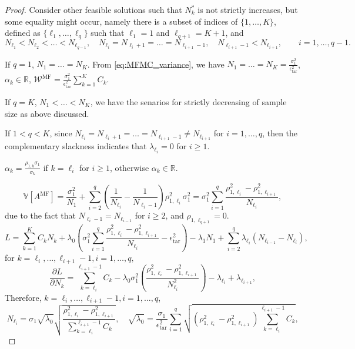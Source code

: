 \begin{proof}




Consider other feasible solutions such that $N_k^*$ is not strictly increases, but some equality might occur, namely there is a subset of indices of $\{1,\ldots, K\}$, defined as $\{\ell_1, \ldots, \ell_q\}$ such that $\ell_1=1$ and $\ell_{q+1} = K+1$, and
\[
N_{\ell_1}<N_{\ell_2}<\ldots < N_{\ell_{q-1}},\quad N_{\ell_i}=N_{\ell_i+1}=\ldots = N_{\ell_{i+1}-1}, \quad N_{\ell_{i+1}-1}<N_{\ell_{i+1}}, \qquad  i=1,\ldots,q-1.
\]


If $q=1$, $N_1=\ldots=N_K$. From \eqref{eq:MFMC_variance}, we have $N_1=\ldots=N_K=\frac{\sigma_1^2}{\epsilon_{\text{tar}}^2}$, $\alpha_k\in \mathbb{R}$, $\mathcal{W}^\text{MF} = \frac{\sigma_1^2}{\epsilon_{\text{tar}}^2} \sum_{k=1}^K C_k$.

If $q=K$, $N_1<\ldots<N_K$, we have the senarios for strictly decreasing of sample size as above discussed.


If $1<q <K$, since $N_{\ell_i}=N_{\ell_i+1}=\ldots=N_{\ell_{i+1}-1}\neq N_{\ell_{i+1}}$ for $i=1,\ldots,q$, then the complementary slackness indicates that $\lambda_{\ell_i}= 0$ for $i\ge 1$.

$\alpha_{k} = \frac{\rho_{1,k}\sigma_1}{\sigma_{k}}$ if $k=\ell_i$ for $i\ge 1$, otherwise $\alpha_k\in \mathbb{R}$. 

\[
\mathbb{V}\left[A^{\text{MF}}\right] = \frac{\sigma_1^2}{N_1}+\sum_{i=2}^q
\left(\frac{1}{N_{\ell_{i}}}-\frac{1}{N_{\ell_{i}-1}}\right)\rho_{1,\ell_i}^2\sigma_1^2=\sigma_1^2 \sum_{i=1}^{q} \frac{\rho_{1,\ell_i}^2-\rho_{1,\ell_{i+1}}^2}{N_{\ell_i}},
\]
due to the fact that $N_{\ell_{i}-1}=N_{\ell_{i-1}}$ for $i\ge 2$, and $\rho_{1,\ell_{q+1}}=0$.
%
\[
L = \sum_{k=1}^K C_kN_k +\lambda_0 \left(\sigma_1^2 \sum_{i=1}^{q} \frac{\rho_{1,\ell_i}^2-\rho_{1,\ell_{i+1}}^2}{N_{\ell_i}}- \epsilon_{\text{tar}}^2\right)-\lambda_1 N_1+\sum_{i=2}^q\lambda_{\ell_{i}}(N_{\ell_{i-1}} - N_{\ell_{i}}),
\]
%
for $k=\ell_i, \ldots, \ell_{i+1}-1, i = 1, \ldots,q,$
\[
\frac{\partial L}{\partial N_{k}} =\sum_{k=\ell_i}^{\ell_{i+1}-1} C_{k} - \lambda_0 \sigma_1^2\left(\frac{\rho_{1,\ell_i}^2-\rho_{1,\ell_{i+1}}^2}{N_{\ell_i}^2}\right)-\lambda_{\ell_{i}}+\lambda_{\ell_{i+1}},
\]
Therefore, $k=\ell_i, \ldots, \ell_{i+1}-1, i = 1, \ldots,q$,
\[
N_{\ell_i} = \sigma_1\sqrt{\lambda_0} \sqrt{\frac{\rho_{1,\ell_i}^2-\rho_{1,\ell_{i+1}}^2}{\sum_{k=\ell_i}^{\ell_{i+1}-1} C_{k}}},\quad \sqrt{\lambda_0}=\frac{\sigma_1}{\epsilon_{\text{tar}}^2} \sum_{i=1}^{q} \sqrt{\left(\rho_{1,\ell_i}^2-\rho_{1,\ell_{i+1}}^2\right)\sum_{k=\ell_i}^{\ell_{i+1}-1} C_{k}},
\]


\end{proof}
